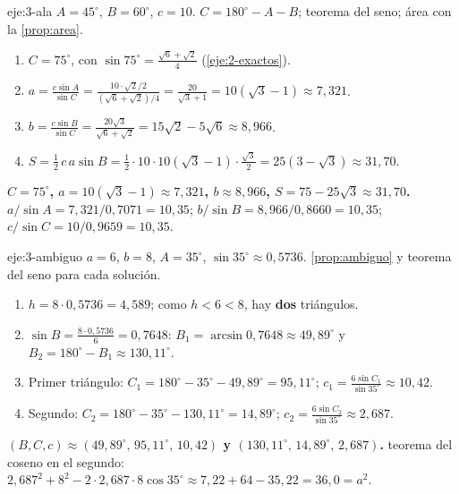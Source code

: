 \begin{solucion}{eje:3-ala}
\datos $A=45^{\circ}$, $B=60^{\circ}$, $c=10$.
\planteamiento $C=180^{\circ}-A-B$; teorema del seno; área con la \cref{prop:area}.
\pasos
\begin{enumerate}[label=\arabic*.]
  \item $C=75^{\circ}$, con $\sin75^{\circ}=\frac{\sqrt6+\sqrt2}{4}$ (\cref{eje:2-exactos}).
  \item $a=\frac{c\sin A}{\sin C}=\frac{10\cdot\sqrt2/2}{(\sqrt6+\sqrt2)/4}=\frac{20}{\sqrt3+1}=10(\sqrt3-1)\approx7{,}321$.
  \item $b=\frac{c\sin B}{\sin C}=\frac{20\sqrt3}{\sqrt6+\sqrt2}=15\sqrt2-5\sqrt6\approx8{,}966$.
  \item $S=\frac12\,c\,a\sin B=\frac12\cdot10\cdot10(\sqrt3-1)\cdot\frac{\sqrt3}{2}=25(3-\sqrt3)\approx31{,}70$.
\end{enumerate}
\resultado \textbf{$C=75^{\circ}$, $a=10(\sqrt3-1)\approx7{,}321$, $b\approx8{,}966$, $S=75-25\sqrt3\approx31{,}70$.}
\comprobacion $a/\sin A=7{,}321/0{,}7071=10{,}35$; $b/\sin B=8{,}966/0{,}8660=10{,}35$; $c/\sin C=10/0{,}9659=10{,}35$.
\end{solucion}

\begin{solucion}{eje:3-ambiguo}
\datos $a=6$, $b=8$, $A=35^{\circ}$, $\sin35^{\circ}\approx0{,}5736$.
\planteamiento \cref{prop:ambiguo} y teorema del seno para cada solución.
\pasos
\begin{enumerate}[label=\arabic*.]
  \item $h=8\cdot0{,}5736=4{,}589$; como $h<6<8$, hay \textbf{dos} triángulos.
  \item $\sin B=\frac{8\cdot0{,}5736}{6}=0{,}7648$: $B_1=\arcsin0{,}7648\approx49{,}89^{\circ}$ y $B_2=180^{\circ}-B_1\approx130{,}11^{\circ}$.
  \item Primer triángulo: $C_1=180^{\circ}-35^{\circ}-49{,}89^{\circ}=95{,}11^{\circ}$; $c_1=\frac{6\sin C_1}{\sin35^{\circ}}\approx10{,}42$.
  \item Segundo: $C_2=180^{\circ}-35^{\circ}-130{,}11^{\circ}=14{,}89^{\circ}$; $c_2=\frac{6\sin C_2}{\sin35^{\circ}}\approx2{,}687$.
\end{enumerate}
\resultado \textbf{$(B,C,c)\approx(49{,}89^{\circ},\,95{,}11^{\circ},\,10{,}42)$ y $(130{,}11^{\circ},\,14{,}89^{\circ},\,2{,}687)$.}
\comprobacion teorema del coseno en el segundo: $2{,}687^{2}+8^{2}-2\cdot2{,}687\cdot8\cos35^{\circ}\approx7{,}22+64-35{,}22=36{,}0=a^{2}$.
\end{solucion}

